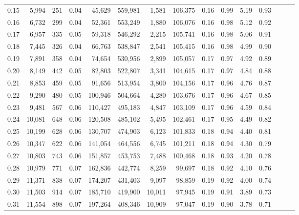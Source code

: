 \begin{tabular}{rrrrrrrrrrrrrrr}
0.15 &   5,994 &    251 &  0.04 &   45,629 &  559,981 &    1,581 &  106,375 &  0.16 &  0.99 &  5.19 &      0.93 \\
0.16 &   6,732 &    299 &  0.04 &   52,361 &  553,249 &    1,880 &  106,076 &  0.16 &  0.98 &  5.12 &      0.92 \\
0.17 &   6,957 &    335 &  0.05 &   59,318 &  546,292 &    2,215 &  105,741 &  0.16 &  0.98 &  5.06 &      0.91 \\
0.18 &   7,445 &    326 &  0.04 &   66,763 &  538,847 &    2,541 &  105,415 &  0.16 &  0.98 &  4.99 &      0.90 \\
0.19 &   7,891 &    358 &  0.04 &   74,654 &  530,956 &    2,899 &  105,057 &  0.17 &  0.97 &  4.92 &      0.89 \\
0.20 &   8,149 &    442 &  0.05 &   82,803 &  522,807 &    3,341 &  104,615 &  0.17 &  0.97 &  4.84 &      0.88 \\
0.21 &   8,853 &    459 &  0.05 &   91,656 &  513,954 &    3,800 &  104,156 &  0.17 &  0.96 &  4.76 &      0.87 \\
0.22 &   9,290 &    480 &  0.05 &  100,946 &  504,664 &    4,280 &  103,676 &  0.17 &  0.96 &  4.67 &      0.85 \\
0.23 &   9,481 &    567 &  0.06 &  110,427 &  495,183 &    4,847 &  103,109 &  0.17 &  0.96 &  4.59 &      0.84 \\
0.24 &  10,081 &    648 &  0.06 &  120,508 &  485,102 &    5,495 &  102,461 &  0.17 &  0.95 &  4.49 &      0.82 \\
0.25 &  10,199 &    628 &  0.06 &  130,707 &  474,903 &    6,123 &  101,833 &  0.18 &  0.94 &  4.40 &      0.81 \\
0.26 &  10,347 &    622 &  0.06 &  141,054 &  464,556 &    6,745 &  101,211 &  0.18 &  0.94 &  4.30 &      0.79 \\
0.27 &  10,803 &    743 &  0.06 &  151,857 &  453,753 &    7,488 &  100,468 &  0.18 &  0.93 &  4.20 &      0.78 \\
0.28 &  10,979 &    771 &  0.07 &  162,836 &  442,774 &    8,259 &   99,697 &  0.18 &  0.92 &  4.10 &      0.76 \\
0.29 &  11,371 &    838 &  0.07 &  174,207 &  431,403 &    9,097 &   98,859 &  0.19 &  0.92 &  4.00 &      0.74 \\
0.30 &  11,503 &    914 &  0.07 &  185,710 &  419,900 &   10,011 &   97,945 &  0.19 &  0.91 &  3.89 &      0.73 \\
0.31 &  11,554 &    898 &  0.07 &  197,264 &  408,346 &   10,909 &   97,047 &  0.19 &  0.90 &  3.78 &      0.71 \\

\end{tabular}
